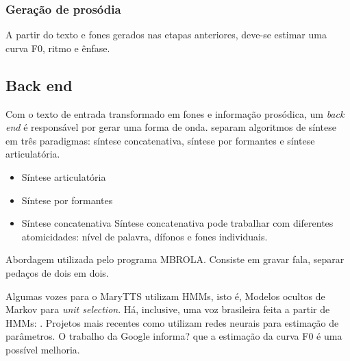 \subsubsection{Geração de prosódia}
A partir do texto e fones gerados nas etapas anteriores, deve-se estimar uma
curva F0, ritmo e ênfase.



\subsection{Back end}
Com o texto de entrada transformado em fones e informação prosódica, um
\emph{back end} é responsável por gerar uma forma de onda.
 separam algoritmos de síntese em três paradigmas:
síntese concatenativa, síntese por formantes e síntese articulatória. 

\begin{itemize}
\item Síntese articulatória
\item Síntese por formantes
\item Síntese concatenativa
Síntese concatenativa pode trabalhar com diferentes atomicidades: nível de palavra,
dífonos e fones individuais.
\end{itemize}



Abordagem utilizada pelo programa MBROLA. Consiste em gravar fala, separar
pedaços de dois em dois.

Algumas vozes para o MaryTTS \cite{marytts} utilizam HMMs, isto é, Modelos
ocultos de Markov para \emph{unit selection}. Há, inclusive, uma voz brasileira
feita a partir de HMMs: \cite{couto}.
Projetos mais recentes como \cite{merlin,dnngoogle} utilizam redes neurais para
estimação de parâmetros. O trabalho da Google informa? que a estimação da curva
F0 é uma possível melhoria.
